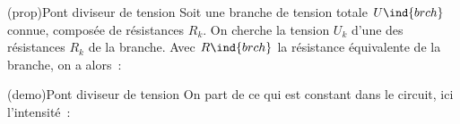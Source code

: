 \documentclass[../../main/main.tex]{subfiles}
\begin{document}
\begin{tcb*}[label=prop:divtens, sidebyside, righthand ratio=.4](prop){Pont
			diviseur de tension}
	Soit une branche de tension totale $U\ind{brch}$ connue, composée de
	résistances $R_k$. On cherche la tension $U_k$ d'une des résistances $R_k$ de
	la branche. Avec $R\ind{brch}$ la résistance équivalente de la branche, on a alors~:
	\psw{%
		\[
			\boxed{U_k = \frac{R_k}{R\ind{brch}}U\ind{brch}}
		\]
	}%
	\vspace{-15pt}
	\tcblower
	\begin{center}
	\end{center}
\end{tcb*}
\begin{tcb*}[label=demo:divtens](demo){Pont diviseur de tension}
	On part de ce qui est constant dans le circuit, ici l'intensité~:
	\vspace{-15pt}
\end{tcb*}
\end{document}

